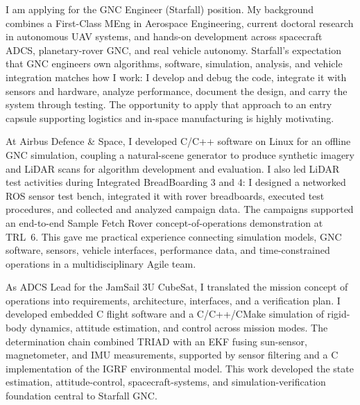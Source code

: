 \documentclass[10pt,a4paper]{article}
\newcommand{\BodySize}{9.25pt}
\newcommand{\BodyLineSize}{12.1pt}
\newcommand{\ParagraphSpacing}{10pt}       %
\newcommand{\LetterParagraph}[1]{%
    \noindent #1\par
    \addvspace{\ParagraphSpacing}%
}
\begin{document}
{\fontsize{\BodySize}{\BodyLineSize}\selectfont
    \color{CVDarkGray}

    \LetterParagraph{%
        I am applying for the GNC Engineer (Starfall) position. My background combines
        a First-Class MEng in Aerospace Engineering, current doctoral research in
        autonomous UAV systems, and hands-on development across spacecraft ADCS,
        planetary-rover GNC, and real vehicle autonomy. Starfall's expectation that GNC
        engineers own algorithms, software, simulation, analysis, and vehicle
        integration matches how I work: I develop and debug the code, integrate it with
        sensors and hardware, analyze performance, document the design, and carry the
        system through testing. The opportunity to apply that approach to an entry
        capsule supporting logistics and in-space manufacturing is highly motivating.%
    }

    \LetterParagraph{%
        At Airbus Defence \& Space, I developed C/C++ software on Linux for an offline
        GNC simulation, coupling a natural-scene generator to produce synthetic imagery
        and LiDAR scans for algorithm development and evaluation. I also led LiDAR test
        activities during Integrated BreadBoarding 3 and 4: I designed a networked ROS
        sensor test bench, integrated it with rover breadboards, executed test
        procedures, and collected and analyzed campaign data. The campaigns supported
        an end-to-end Sample Fetch Rover concept-of-operations demonstration at TRL~6.
        This gave me practical experience connecting simulation models, GNC software,
        sensors, vehicle interfaces, performance data, and time-constrained
        operations in a multidisciplinary Agile team.%
    }

    \LetterParagraph{%
        As ADCS Lead for the JamSail 3U CubeSat, I translated the mission concept of
        operations into requirements, architecture, interfaces, and a verification
        plan. I developed embedded C flight software and a C/C++/CMake simulation of
        rigid-body dynamics, attitude estimation, and control across mission modes. The
        determination chain combined TRIAD with an EKF fusing sun-sensor,
        magnetometer, and IMU measurements, supported by sensor filtering and a C
        implementation of the IGRF environmental model. This work developed the state
        estimation, attitude-control, spacecraft-systems, and simulation-verification
        foundation central to Starfall GNC.%
    }

}
\end{document}
